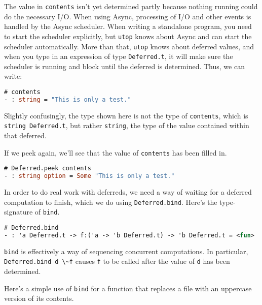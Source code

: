 The value in \passthrough{\lstinline!contents!} isn't yet determined
partly because nothing running could do the necessary I/O. When using
Async, processing of I/O and other events is handled by the Async
scheduler. When writing a standalone program, you need to start the
scheduler explicitly, but \passthrough{\lstinline!utop!} knows about
Async and can start the scheduler automatically. More than that,
\passthrough{\lstinline!utop!} knows about deferred values, and when you
type in an expression of type \passthrough{\lstinline!Deferred.t!}, it
will make sure the scheduler is running and block until the deferred is
determined. Thus, we can write:

\begin{lstlisting}[language=Caml]
# contents
- : string = "This is only a test."
\end{lstlisting}

Slightly confusingly, the type shown here is not the type of
\passthrough{\lstinline!contents!}, which is
\passthrough{\lstinline!string Deferred.t!}, but rather
\passthrough{\lstinline!string!}, the type of the value contained within
that deferred.

If we peek again, we'll see that the value of
\passthrough{\lstinline!contents!} has been filled in.

\begin{lstlisting}[language=Caml]
# Deferred.peek contents
- : string option = Some "This is only a test."
\end{lstlisting}

In order to do real work with deferreds, we need a way of waiting for a
deferred computation to finish, which we do using
\passthrough{\lstinline!Deferred.bind!}. Here's the type-signature of
\passthrough{\lstinline!bind!}.

\begin{lstlisting}[language=Caml]
# Deferred.bind
- : 'a Deferred.t -> f:('a -> 'b Deferred.t) -> 'b Deferred.t = <fun>
\end{lstlisting}

\passthrough{\lstinline!bind!} is effectively a way of sequencing
concurrent computations. In particular,
\passthrough{\lstinline!Deferred.bind d \~f!} causes
\passthrough{\lstinline!f!} to be called after the value of
\passthrough{\lstinline!d!} has been determined. 

Here's a simple use of \passthrough{\lstinline!bind!} for a function
that replaces a file with an uppercase version of its contents.


